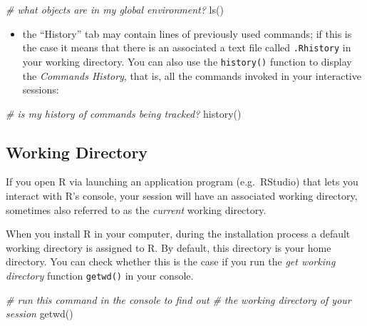 \documentclass[
]{book}
\newenvironment{Shaded}{\begin{snugshade}}{\end{snugshade}}
\newcommand{\CommentTok}[1]{\textcolor[rgb]{0.56,0.35,0.01}{\textit{#1}}}
\newcommand{\FunctionTok}[1]{\textcolor[rgb]{0.00,0.00,0.00}{#1}}
\newcommand{\NormalTok}[1]{#1}
\providecommand{\tightlist}{%
  \setlength{\itemsep}{0pt}\setlength{\parskip}{0pt}}
\begin{document}
\begin{Shaded}
\begin{Highlighting}[]
\CommentTok{\# what objects are in my global environment?}
\FunctionTok{ls}\NormalTok{()}
\end{Highlighting}
\end{Shaded}

\begin{itemize}
\tightlist
\item
  the ``History'' tab may contain lines of previously used commands; if this is
  the case it means that there is an associated a text file called \texttt{.Rhistory} in
  your working directory. You can also use the \texttt{history()} function to display
  the \emph{Commands History}, that is, all the commands invoked in your interactive
  sessions:
\end{itemize}

\begin{Shaded}
\begin{Highlighting}[]
\CommentTok{\# is my history of commands being tracked?}
\FunctionTok{history}\NormalTok{()}
\end{Highlighting}
\end{Shaded}

\hypertarget{working-directory}{%
\subsection{Working Directory}\label{working-directory}}

If you open R via launching an application program (e.g.~RStudio) that lets
you interact with R's console, your session will have an associated working
directory, sometimes also referred to as the \emph{current} working directory.

When you install R in your computer, during the installation process a default
working directory is assigned to R. By default, this directory is your home
directory. You can check whether this is the case if you run the
\emph{get working directory} function \texttt{getwd()} in your console.

\begin{Shaded}
\begin{Highlighting}[]
\CommentTok{\# run this command in the console to find out }
\CommentTok{\# the working directory of your session}
\FunctionTok{getwd}\NormalTok{()}
\end{Highlighting}
\end{Shaded}
\end{document}
